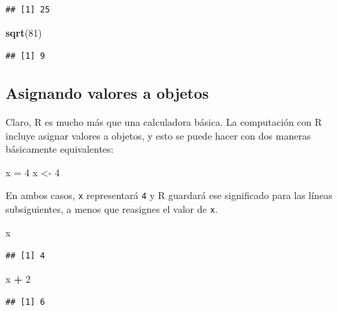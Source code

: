 \documentclass[
]{article}
\newenvironment{Shaded}{\begin{snugshade}}{\end{snugshade}}
\newcommand{\DecValTok}[1]{\textcolor[rgb]{0.00,0.00,0.81}{#1}}
\newcommand{\FunctionTok}[1]{\textcolor[rgb]{0.13,0.29,0.53}{\textbf{#1}}}
\newcommand{\NormalTok}[1]{#1}
\newcommand{\OtherTok}[1]{\textcolor[rgb]{0.56,0.35,0.01}{#1}}
\newcommand{\SpecialCharTok}[1]{\textcolor[rgb]{0.81,0.36,0.00}{\textbf{#1}}}
\begin{document}
\begin{verbatim}
## [1] 25
\end{verbatim}

\begin{Shaded}
\begin{Highlighting}[]
\FunctionTok{sqrt}\NormalTok{(}\DecValTok{81}\NormalTok{)}
\end{Highlighting}
\end{Shaded}

\begin{verbatim}
## [1] 9
\end{verbatim}

\subsection{Asignando valores a
objetos}\label{asignando-valores-a-objetos}

Claro, R es mucho más que una calculadora básica. La computación con R
incluye asignar valores a objetos, y esto se puede hacer con dos maneras
básicamente equivalentes:

\begin{Shaded}
\begin{Highlighting}[]
\NormalTok{x }\OtherTok{=} \DecValTok{4}
\NormalTok{x }\OtherTok{\textless{}{-}} \DecValTok{4}
\end{Highlighting}
\end{Shaded}

En ambos casos, \texttt{x} representará \texttt{4} y R guardará ese
significado para las líneas subsiguientes, a menos que reasignes el
valor de \texttt{x}.

\begin{Shaded}
\begin{Highlighting}[]
\NormalTok{x}
\end{Highlighting}
\end{Shaded}

\begin{verbatim}
## [1] 4
\end{verbatim}

\begin{Shaded}
\begin{Highlighting}[]
\NormalTok{x }\SpecialCharTok{+} \DecValTok{2}
\end{Highlighting}
\end{Shaded}

\begin{verbatim}
## [1] 6
\end{verbatim}
\end{document}
